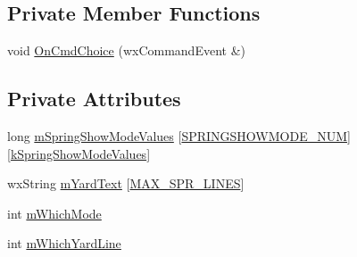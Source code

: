 \subsection*{Private Member Functions}
\begin{DoxyCompactItemize}
\item 
void \hyperlink{a00144_ac1cd0dcfcfb007b41d75bb57a1a0e72a}{On\-Cmd\-Choice} (wx\-Command\-Event \&)
\end{DoxyCompactItemize}
\subsection*{Private Attributes}
\begin{DoxyCompactItemize}
\item 
long \hyperlink{a00144_ac48fab376e165248b769655a820c6a8a}{m\-Spring\-Show\-Mode\-Values} \mbox{[}\hyperlink{a00191_ae3fb6f10d83fa2ee9e5cb18156a5b932aaedac2791ff57e50494f873148ddeef3}{S\-P\-R\-I\-N\-G\-S\-H\-O\-W\-M\-O\-D\-E\-\_\-\-N\-U\-M}\mbox{]}\mbox{[}\hyperlink{a00191_ad4adeccc0bb8604edd3f05ef8e639fcd}{k\-Spring\-Show\-Mode\-Values}\mbox{]}
\item 
wx\-String \hyperlink{a00144_a43310058719c2623dd4e19367ef83f98}{m\-Yard\-Text} \mbox{[}\hyperlink{a00191_af967bcf8c2a02116db262bf1e1777a1a}{M\-A\-X\-\_\-\-S\-P\-R\-\_\-\-L\-I\-N\-E\-S}\mbox{]}
\item 
int \hyperlink{a00144_a79ea08e9358fd9dbc26a79e277398c9e}{m\-Which\-Mode}
\item 
int \hyperlink{a00144_a47782334f5e8704b2246fe281a0c0866}{m\-Which\-Yard\-Line}
\end{DoxyCompactItemize}


